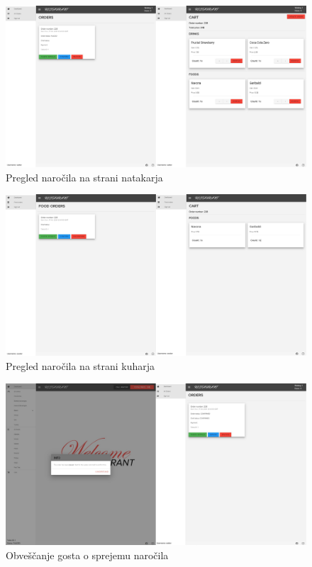 \documentclass[a4paper, 12pt]{book}
\begin{document}
\begin{figure}[!htb]
\begin{center}
\includegraphics[width=14.5cm]{opis2.jpg}
\caption{Pregled naročila na strani natakarja}
\label{Opis3}
\end{center}
\end{figure}
\begin{figure}[!htb]
\begin{center}
\includegraphics[width=14.5cm]{opis3.jpg}
\caption{Pregled naročila na strani kuharja}
\label{Opis4}
\end{center}
\end{figure}
\begin{figure}[!htb]
\begin{center}
\includegraphics[width=14.5cm]{opis5.jpg}
\caption{Obveščanje gosta o sprejemu naročila}
\label{Opis5}
\end{center}
\end{figure}
\end{document}
